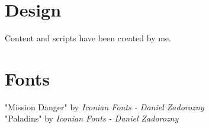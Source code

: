 \section{Design}
Content and scripts have been created by me.

\section*{Fonts}
"Mission Danger" by \textit{Iconian Fonts - Daniel Zadorozny}\\
"Paladins" by \textit{Iconian Fonts - Daniel Zadorozny}

